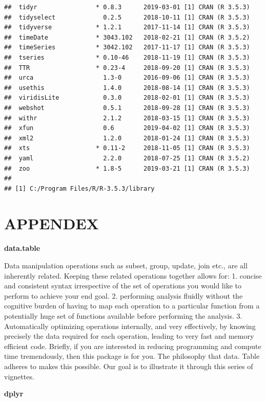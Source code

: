 \documentclass[12pt,openany]{book}
\begin{document}
\begin{verbatim}
##  tidyr                * 0.8.3      2019-03-01 [1] CRAN (R 3.5.3)
##  tidyselect             0.2.5      2018-10-11 [1] CRAN (R 3.5.3)
##  tidyverse            * 1.2.1      2017-11-14 [1] CRAN (R 3.5.3)
##  timeDate             * 3043.102   2018-02-21 [1] CRAN (R 3.5.2)
##  timeSeries           * 3042.102   2017-11-17 [1] CRAN (R 3.5.3)
##  tseries              * 0.10-46    2018-11-19 [1] CRAN (R 3.5.3)
##  TTR                  * 0.23-4     2018-09-20 [1] CRAN (R 3.5.3)
##  urca                   1.3-0      2016-09-06 [1] CRAN (R 3.5.3)
##  usethis                1.4.0      2018-08-14 [1] CRAN (R 3.5.3)
##  viridisLite            0.3.0      2018-02-01 [1] CRAN (R 3.5.3)
##  webshot                0.5.1      2018-09-28 [1] CRAN (R 3.5.3)
##  withr                  2.1.2      2018-03-15 [1] CRAN (R 3.5.3)
##  xfun                   0.6        2019-04-02 [1] CRAN (R 3.5.3)
##  xml2                   1.2.0      2018-01-24 [1] CRAN (R 3.5.3)
##  xts                  * 0.11-2     2018-11-05 [1] CRAN (R 3.5.3)
##  yaml                   2.2.0      2018-07-25 [1] CRAN (R 3.5.2)
##  zoo                  * 1.8-5      2019-03-21 [1] CRAN (R 3.5.3)
## 
## [1] C:/Program Files/R/R-3.5.3/library
\end{verbatim}

\hypertarget{appendex}{%
\chapter{APPENDEX}\label{appendex}}

\textbf{data.table}

Data manipulation operations such as subset, group, update, join etc., are all inherently related. Keeping these related operations together allows for:
1. concise and consistent syntax irrespective of the set of operations you would like to perform to achieve your end goal.
2. performing analysis fluidly without the cognitive burden of having to map each operation to a particular function from a potentially huge set of functions available before performing the analysis.
3. Automatically optimizing operations internally, and very effectively, by knowing precisely the data required for each operation, leading to very fast and memory efficient code.
Briefly, if you are interested in reducing programming and compute time tremendously, then this package is for you. The philosophy that data. Table adheres to makes this possible. Our goal is to illustrate it through this series of vignettes.

\textbf{dplyr}
\end{document}
